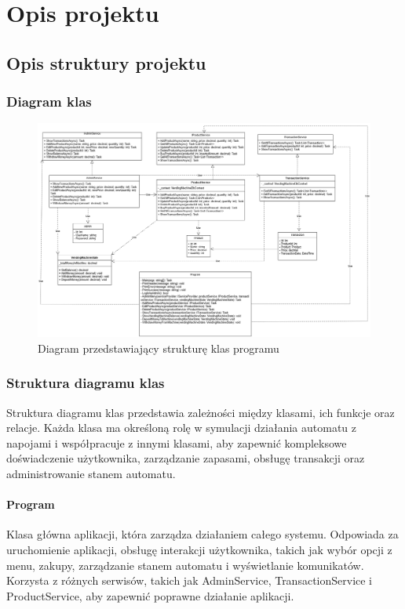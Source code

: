 

\chapter{Opis projektu}
\section{Opis struktury projektu}

\subsection{Diagram klas}


\begin{figure}[H] %
    \centering
    \includegraphics[width=1\textwidth ]{grafiki/diag_klas.PNG}
    \caption{\footnotesize Diagram przedstawiający strukturę klas programu}	
\end{figure}
\newpage

\subsection{Struktura diagramu klas}

Struktura diagramu klas przedstawia zależności między klasami, ich funkcje oraz relacje. Każda klasa ma określoną rolę w symulacji działania automatu z napojami i współpracuje z innymi klasami, aby zapewnić kompleksowe doświadczenie użytkownika, zarządzanie zapasami, obsługę transakcji oraz administrowanie stanem automatu.

\subsubsection*{Program}
Klasa główna aplikacji, która zarządza działaniem całego systemu. Odpowiada za uruchomienie aplikacji, obsługę interakcji użytkownika, takich jak wybór opcji z menu, zakupy, zarządzanie stanem automatu i wyświetlanie komunikatów. Korzysta z różnych serwisów, takich jak AdminService, TransactionService i ProductService, aby zapewnić poprawne działanie aplikacji.

